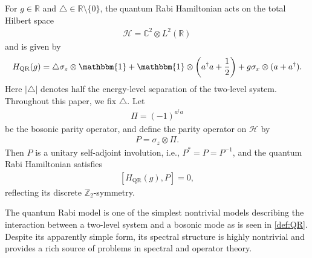 \documentclass[12pt,dvipdfmx]{article}
\newcommand{\RR}{\mathbb{R}}
\newcommand{\ZZ}{\mathbb{Z}}
\newcommand{\CC}{\mathbb{C}}
\newcommand{\one}{\mathbbm{1}}
\newcommand{\cH}{\mathcal{H}}
\begin{document}
For $g \in \RR$ and $\triangle \in \RR \setminus \{0\}$, the quantum Rabi Hamiltonian acts on the total Hilbert space 
\begin{align*}
    \cH  = \CC^2 \otimes L^2(\RR)
\end{align*} 
and is given by
\begin{align}\label{def:QR}
    H_\mathrm{QR}(g) 
    = 
    \triangle\sigma_z \otimes \one 
    + 
    \one \otimes \left(a^\dagger a + \frac12\right) 
    + 
    g\sigma_x \otimes (a + a^\dagger).
\end{align}
Here   
$|\triangle|$ denotes half the energy-level separation of the two-level system. Throughout this paper, we fix $\triangle$. Let
\begin{align*}
    \Pi = (-1)^{a^\dagger a}
\end{align*}
be the bosonic parity operator, and define the parity operator on $\cH$ by
\begin{align*}
    P = \sigma_z \otimes \Pi.
\end{align*}
Then $P$ is a unitary self-adjoint involution, i.e., $P^\ast=P=P^{-1}$, and the quantum Rabi Hamiltonian satisfies
\begin{align}\label{eq:QR_Z2_symm}
    [H_{\mathrm{QR}}(g), P] = 0,
\end{align}
reflecting its discrete $\ZZ_2$-symmetry.


The quantum Rabi model is one of the simplest nontrivial models describing the interaction between a two-level system and a bosonic mode as is seen in \eqref{def:QR}. 
Despite its apparently simple form, its spectral structure is highly nontrivial and provides a rich source of problems in spectral and operator theory. 
%
%
\end{document}
